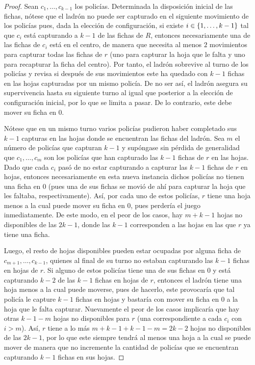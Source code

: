 \begin{proof}
    Sean $c_1,\dots, c_{k-1}$ los polic\'ias. Determinada la disposici\'on
    inicial de las fichas, n\'otese que el ladr\'on no puede ser capturado en el
    siguiente movimiento de los polic\'ias pues, dada la elecci\'on de
    configuraci\'on, si existe $i\in\{1,\dots, k-1\}$ tal que $c_i$ est\'a
    capturando a $k-1$ de las fichas de $R$, entonces necesariamente una de las
    fichas de $c_i$ est\'a en el centro, de manera que necesita al menos $2$
    movimientos para capturar todas las fichas de $r$ (uno para capturar la hoja
    que le falta y uno para recapturar la ficha del centro). Por tanto, el
    ladr\'on sobrevive al turno de los polic\'ias y revisa si despu\'es de sus
    movimientos este ha quedado con $k-1$ fichas en las hojas capturadas por un
    mismo polic\'ia. De no ser as\'i, el ladr\'on asegura su supervivencia hasta
    su siguiente turno al igual que posterior a la elecci\'on de configuraci\'on
    inicial, por lo que se limita a pasar. De lo contrario, este debe mover su
    ficha en $0$.
    
    N\'otese que en un mismo turno varios polic\'ias pudieron haber completado
    sus $k-1$ capturas en las hojas donde se encuentran las fichas del ladr\'on.
    Sea $m$ el n\'umero de polic\'ias que capturan $k-1$ y sup\'ongase sin
    p\'erdida de generalidad que $c_{1},\dots, c_{m}$ son los polic\'ias que han
    capturado las $k-1$ fichas de $r$ en las hojas. Dado que cada $c_{i}$ pas\'o
    de no estar capturando a capturar las $k-1$ fichas de $r$ en hojas, entonces
    necesariamente en esta nueva instancia dichos polic\'ias no tienen una ficha
    en $0$ (pues una de sus fichas se movi\'o de ah\'i para capturar la hoja que
    les faltaba, respectivamente). As\'i, por cada uno de estos polic\'ias, $r$
    tiene una hoja menos a la cual puede mover su ficha en $0$, pues perder\'ia
    el juego inmediatamente. De este modo, en el peor de los casos, hay $m+k-1$
    hojas no disponibles de las $2k-1$, donde las $k-1$ corresponden a las hojas
    en las que $r$ ya tiene una ficha.

   Luego, el resto de hojas disponibles pueden estar ocupadas por alguna ficha
   de  $c_{{m+1}},\dots,c_{{k-1}}$, quienes al final de su turno no estaban
   capturando las $k-1$ fichas en hojas de $r$. Si alguno de estos polic\'ias
   tiene una de sus fichas en $0$ y est\'a capturando $k-2$ de las $k-1$ fichas
   en hojas de $r$, entonces el ladr\'on tiene una hoja menos a la cual puede
   moverse, pues de hacerlo, este provocar\'ia que tal polic\'ia le capture
   $k-1$ fichas en hojas y bastar\'ia con mover su ficha en $0$ a la hoja que le
   falta capturar. Nuevamente el peor de los casos implicar\'ia que hay otras
   $k-1-m$ hojas no disponibles para $r$ (una correspondiente a cada $c_i$ con
   $i>m$). As\'i, $r$ tiene a lo m\'as $m+k-1+k-1-m=2k-2$ hojas no disponibles
   de las $2k-1$, por lo que este siempre tendr\'a al menos una hoja a la cual
   se puede mover de manera que no incremente la cantidad de polic\'ias que se
   encuentran capturando $k-1$ fichas en sus hojas.


\end{proof}
